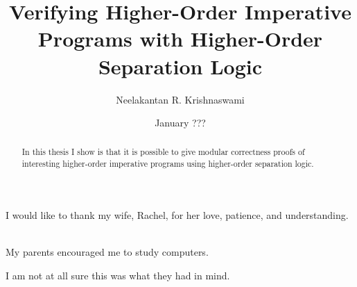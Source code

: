 \documentclass[12pt]{cmuthesis}
\begin{document}
 
\frontmatter

\pagestyle{empty}

\title{ %
{\bf Verifying Higher-Order Imperative Programs with Higher-Order Separation Logic}}
\author{Neelakantan R. Krishnaswami}
\date{January ???}
\trnumber{}


\support{}
\disclaimer{}



\maketitle

\begin{dedication}
I would like to thank my wife, Rachel, for her love, patience, and
understanding. 

\ \\

My parents encouraged me to study computers.

I am not at all sure this was what they had in mind. 
\end{dedication}

\pagestyle{plain} %


\begin{abstract}
In this thesis I show is that it is possible to give modular
correctness proofs of interesting higher-order imperative programs
using higher-order separation logic.
\end{abstract}
\end{document}
